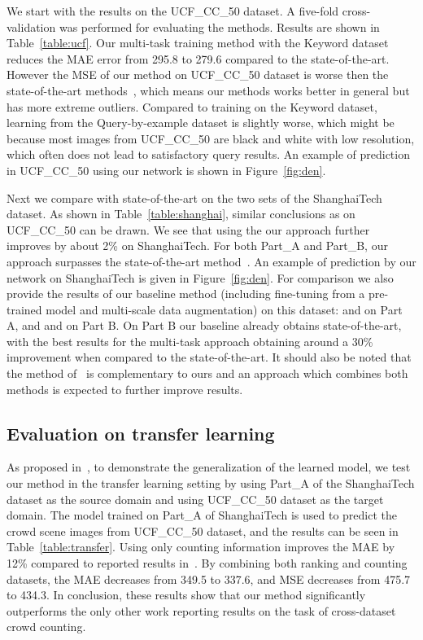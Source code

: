 \documentclass[10pt,twocolumn,letterpaper]{article}
\begin{document}
We start with the results on the UCF\_CC\_50 dataset.  A five-fold
cross-validation was performed for evaluating the methods. Results are
shown in Table~\ref{table:ucf}. Our multi-task training method with
the Keyword dataset reduces the MAE error from 295.8 to 279.6 compared to
the state-of-the-art. However the MSE of our method on UCF\_CC\_50
dataset is worse then the state-of-the-art
methods~\cite{walach2016learning,sindagi2017generating}, which means
our methods works better in general but has more extreme
outliers. Compared to training on the Keyword dataset, learning from
the Query-by-example dataset is slightly worse, which might be because
most images from UCF\_CC\_50 are black and white with low
resolution, which often does not lead to satisfactory query
results. An example of prediction in UCF\_CC\_50 using our
network is shown in Figure~\ref{fig:den}.

Next we compare with state-of-the-art on the two sets of the
ShanghaiTech dataset.  As shown in Table~\ref{table:shanghai}, similar 
conclusions as on UCF\_CC\_50 can be drawn. We see that using the
our approach further improves by about 2\% on ShanghaiTech. For both Part\_A and Part\_B, our approach surpasses the
state-of-the-art method~\cite{sindagi2017generating}.  An example of
prediction by our network on ShanghaiTech is given in
Figure~\ref{fig:den}. For comparison we also provide the results of
our baseline method (including fine-tuning from a pre-trained model
and multi-scale data augmentation) on this dataset:  and  on
Part A, and  and  on Part B. 
On Part B our baseline already obtains state-of-the-art, with the best
results for the multi-task approach obtaining around a 30\%
improvement when compared to the state-of-the-art. It should also be
noted that the method of~\cite{sindagi2017generating} is complementary
to ours and an approach which combines both methods is expected to
further improve results.


\subsection{Evaluation on transfer learning}

As proposed in~\cite{zhang2016single}, to demonstrate the
generalization of the learned model, we test our method in the
transfer learning setting by using Part\_A of the ShanghaiTech dataset
as the source domain and using UCF\_CC\_50 dataset as the target
domain. The model trained on Part\_A of ShanghaiTech is used to
predict the crowd scene images from UCF\_CC\_50 dataset, and the
results can be seen in Table~\ref{table:transfer}. Using only counting
information improves the MAE by 12\% compared to reported results
in~\cite{zhang2016single}. By combining both ranking and counting
datasets, the MAE decreases from 349.5 to 337.6, and MSE decreases
from 475.7 to 434.3. In conclusion, these results show that our method
significantly outperforms the only other work reporting results
on the task of cross-dataset crowd counting.
\end{document}
